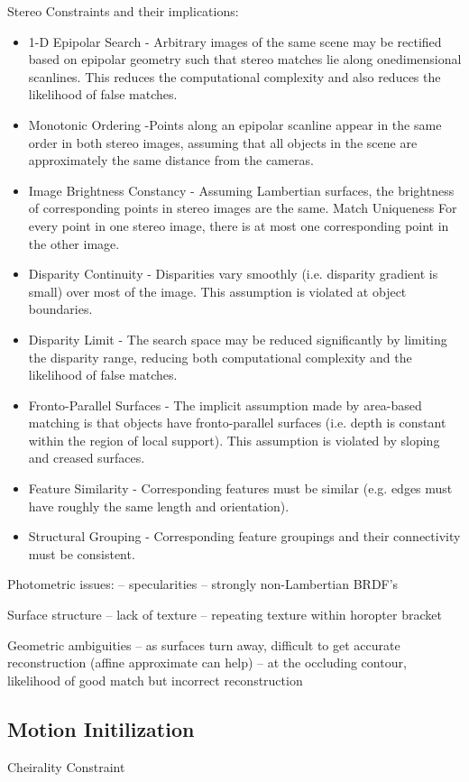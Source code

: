 Stereo Constraints and their implications:
\begin{itemize}
\item 1-D Epipolar Search -  Arbitrary images of the same scene may be rectified based on epipolar geometry such that stereo matches lie along onedimensional scanlines. This reduces the computational complexity
and also reduces the likelihood of false matches.
\item Monotonic Ordering  -Points along an epipolar scanline appear in the same order in both stereo images, assuming that all objects in the scene are approximately the same distance from the cameras.
\item Image Brightness Constancy - Assuming Lambertian surfaces, the brightness of corresponding
points in stereo images are the same.
Match Uniqueness For every point in one stereo image, there is at most one corresponding point in the other image.
\item Disparity Continuity - Disparities vary smoothly (i.e. disparity gradient is small) over most of the image. This assumption is violated at object boundaries.
\item Disparity Limit - The search space may be reduced significantly by limiting the disparity range, reducing both computational complexity and the likelihood of false matches.
\item Fronto-Parallel Surfaces - The implicit assumption made by area-based matching is that objects have fronto-parallel surfaces (i.e. depth is constant within the region of local support). This assumption is violated by sloping and creased surfaces.
\item Feature Similarity - Corresponding features must be similar (e.g. edges must have roughly the same length and orientation).
\item Structural Grouping - Corresponding feature groupings and their connectivity must be consistent.
\end{itemize}


Photometric issues:
– specularities
– strongly non-Lambertian BRDF’s

Surface structure
– lack of texture
– repeating texture within horopter bracket

Geometric ambiguities
– as surfaces turn away, difficult to get accurate reconstruction
(affine approximate can help)
– at the occluding contour, likelihood of good match but incorrect
reconstruction


\subsection{Motion Initilization}
Cheirality Constraint


